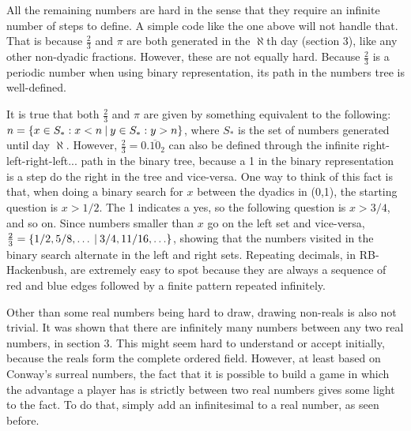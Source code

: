 All the remaining numbers are hard in the sense that they require an infinite number of steps to define. A simple code like the one above will not handle that. That is because $\frac{2}{3}$ and $\pi$ are both generated in the $\aleph$th day (section 3), like any other non-dyadic fractions. However, these are not equally hard. Because $\frac{2}{3}$ is a periodic number when using binary representation, its path in the numbers tree is well-defined.

It is true that both $\frac{2}{3}$ and $\pi$ are given by something equivalent to the following: $n = \mbox{$\{x \in S_*:x < n\:|\:y \in S_*:y>n\}$}$, where $S_*$ is the set of numbers generated until day $\aleph$. However, $\frac{2}{3}=0.\overline{10}_2$ can also be defined through the infinite right-left-right-left... path in the binary tree, because a 1 in the binary representation is a step do the right in the tree and vice-versa. One way to think of this fact is that, when doing a binary search for $x$ between the dyadics in (0,1), the starting question is $x > 1/2$. The 1 indicates a yes, so the following question is $x > 3/4$, and so on. Since numbers smaller than $x$ go on the left set and vice-versa, $\frac{2}{3} = \mbox{$\{1/2, 5/8, \ldots\:|\:3/4,11/16,\ldots\}$}$, showing that the numbers visited in the binary search alternate in the left and right sets. Repeating decimals, in RB-Hackenbush, are extremely easy to spot because they are always a sequence of red and blue edges followed by a finite pattern repeated infinitely.

Other than some real numbers being hard to draw, drawing non-reals is also not trivial. It was shown that there are infinitely many numbers between any two real numbers, in section 3. This might seem hard to understand or accept initially, because the reals form the complete ordered field. However, at least based on Conway's surreal numbers, the fact that it is possible to build a game in which the advantage a player has is strictly between two real numbers gives some light to the fact. To do that, simply add an infinitesimal to a real number, as seen before.

